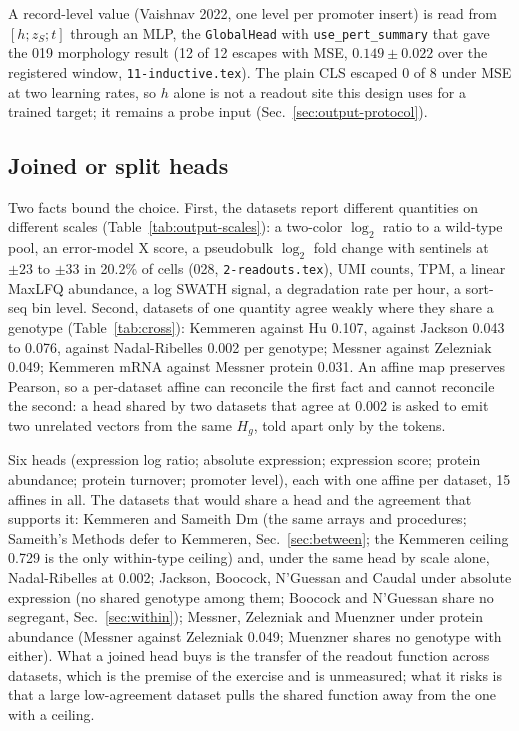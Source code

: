 A record-level value (Vaishnav 2022, one level per promoter insert) is read from
$[h ; z_S ; t]$ through an MLP, the \texttt{GlobalHead} with \texttt{use\_pert\_summary}
that gave the 019 morphology result (12 of 12 escapes with MSE, $0.149 \pm 0.022$ over the
registered window, \texttt{11-inductive.tex}). The plain CLS escaped 0 of 8 under MSE at
two learning rates, so $h$ alone is not a readout site this design uses for a trained
target; it remains a probe input (Sec.~\ref{sec:output-protocol}).

\subsection{Joined or split heads}
\label{sec:output-heads}

Two facts bound the choice. First, the datasets report different quantities on different
scales (Table~\ref{tab:output-scales}): a two-color $\log_2$ ratio to a wild-type pool, an
error-model X score, a pseudobulk $\log_2$ fold change with sentinels at $\pm 23$ to
$\pm 33$ in 20.2\% of cells (028, \texttt{2-readouts.tex}), UMI counts, TPM, a linear
MaxLFQ abundance, a log SWATH signal, a degradation rate per hour, a sort-seq bin level.
Second, datasets of one quantity agree weakly where they share a genotype
(Table~\ref{tab:cross}): Kemmeren against Hu 0.107, against Jackson 0.043 to 0.076,
against Nadal-Ribelles 0.002 per genotype; Messner against Zelezniak 0.049; Kemmeren mRNA
against Messner protein 0.031. An affine map preserves Pearson, so a per-dataset affine can
reconcile the first fact and cannot reconcile the second: a head shared by two datasets
that agree at 0.002 is asked to emit two unrelated vectors from the same $H_g$, told apart
only by the tokens.

Six heads (expression log ratio; absolute expression; expression score; protein abundance;
protein turnover; promoter level), each with one affine per dataset, 15 affines in all. The
datasets that would share a head and the agreement that supports it: Kemmeren and Sameith
Dm (the same arrays and procedures; Sameith's Methods defer to Kemmeren,
Sec.~\ref{sec:between}; the Kemmeren ceiling 0.729 is the only within-type ceiling) and,
under the same head by scale alone, Nadal-Ribelles at 0.002; Jackson, Boocock, N'Guessan
and Caudal under absolute expression (no shared genotype among them; Boocock and N'Guessan
share no segregant, Sec.~\ref{sec:within}); Messner, Zelezniak and Muenzner under protein
abundance (Messner against Zelezniak 0.049; Muenzner shares no genotype with either).
What a joined head buys is the transfer of the readout function across datasets, which is
the premise of the exercise and is unmeasured; what it risks is that a large low-agreement
dataset pulls the shared function away from the one with a ceiling.

